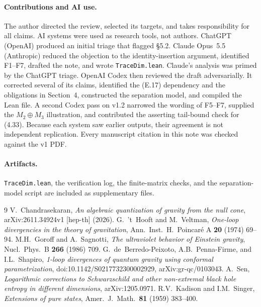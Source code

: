 \documentclass[11pt]{article}
\theoremstyle{remark}
\begin{document}
\paragraph{Contributions and AI use.} The author directed the review, selected its
targets, and takes responsibility for all claims. AI systems were used as research
tools, not authors. ChatGPT (OpenAI) produced an initial triage that flagged \S5.2.
Claude Opus~5.5 (Anthropic) reduced the objection to the identity-insertion argument,
identified F1--F7,
drafted the note, and wrote \texttt{TraceDim.lean}. Claude's analysis was primed by the
ChatGPT triage. OpenAI Codex then reviewed the draft adversarially. It corrected several
of its claims, identified the (E.17) dependency and the obligations in Section~4,
constructed the separation model, and compiled the Lean file. A second Codex pass on
v1.2 narrowed the wording of F5--F7, supplied the $M_2\oplus M_3$ illustration, and
contributed the asserting tail-bound check for (4.33). Because each system saw
earlier outputs, their agreement is not independent replication. Every manuscript
citation in this note was checked against the v1 PDF.

\paragraph{Artifacts.} \texttt{TraceDim.lean}, the verification log, the
finite-matrix checks, and the separation-model script are included as supplementary
files.

\begin{thebibliography}{9}
 V.~Chandrasekaran, \emph{An algebraic quantization of gravity from the null cone}, arXiv:2611.34924v1 [hep-th] (2026).
 G.~'t~Hooft and M.~Veltman, \emph{One-loop divergencies in the theory of gravitation}, Ann.\ Inst.\ H.\ Poincar\'e A \textbf{20} (1974) 69--94.
 M.H.~Goroff and A.~Sagnotti, \emph{The ultraviolet behavior of Einstein gravity}, Nucl.\ Phys.\ B \textbf{266} (1986) 709.
 G.~de~Berredo-Peixoto, A.B.~Penna-Firme, and I.L.~Shapiro, \emph{1-loop divergences of quantum gravity using conformal parametrization}, doi:10.1142/S0217732300002929, arXiv:gr-qc/0103043.
 A.~Sen, \emph{Logarithmic corrections to Schwarzschild and other non-extremal black hole entropy in different dimensions}, arXiv:1205.0971.
 R.V.~Kadison and I.M.~Singer, \emph{Extensions of pure states}, Amer.\ J.\ Math.\ \textbf{81} (1959) 383--400.
\end{thebibliography}
\end{document}
